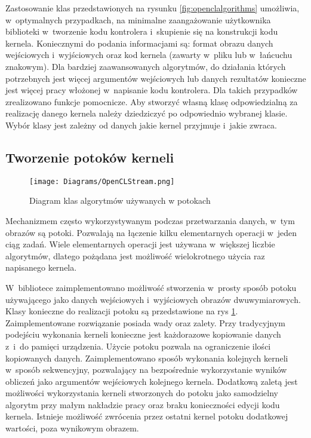 Zastosowanie klas przedstawionych na rysunku \ref{fig:openclalgorithms} umożliwia, w~optymalnych przypadkach, na minimalne zaangażowanie użytkownika biblioteki w~tworzenie kodu kontrolera i~skupienie się na konstrukcji kodu kernela. Koniecznymi do podania informacjami są: format obrazu danych wejściowych i~wyjściowych oraz kod kernela (zawarty w~pliku lub w~łańcuchu znakowym). Dla bardziej zaawansowanych algorytmów, do działania których potrzebnych jest więcej argumentów wejściowych lub danych rezultatów konieczne jest więcej pracy włożonej w~napisanie kodu kontrolera. Dla takich przypadków zrealizowano funkcje pomocnicze. Aby stworzyć własną klasę odpowiedzialną za realizację danego kernela należy dziedziczyć po odpowiednio wybranej klasie. Wybór klasy jest zależny od danych jakie kernel przyjmuje i~jakie zwraca.

\subsection{Tworzenie potoków kerneli}
\label{subsec:potokikerneli}

\begin{figure}
\begin{center}
\texttt{[image: Diagrams/OpenCLStream.png]}
\end{center}
\caption{Diagram klas algorytmów używanych w potokach}
\label{fig:diagrampotok}
\end{figure}

Mechanizmem często wykorzystywanym podczas przetwarzania danych, w~tym obrazów są potoki. Pozwalają na łączenie kilku elementarnych operacji w~jeden ciąg zadań. Wiele elementarnych operacji jest używana w~większej liczbie algorytmów, dlatego pożądana jest możliwość wielokrotnego użycia raz napisanego kernela.

W~bibliotece zaimplementowano możliwość stworzenia w~prosty sposób potoku używającego jako danych wejściowych i~wyjściowych obrazów dwuwymiarowych. Klasy konieczne do realizacji potoku są przedstawione na rys \ref{fig:diagrampotok}. Zaimplementowane rozwiązanie posiada wady oraz zalety. Przy tradycyjnym podejściu wykonania kerneli konieczne jest każdorazowe kopiowanie danych z~i~do pamięci urządzenia. Użycie potoku pozwala na ograniczenie ilości kopiowanych danych. Zaimplementowano sposób wykonania kolejnych kerneli w~sposób sekwencyjny, pozwalający na bezpośrednie wykorzystanie wyników obliczeń jako argumentów wejściowych kolejnego kernela. Dodatkową zaletą jest możliwości wykorzystania kerneli stworzonych do potoku jako samodzielny algorytm przy małym nakładzie pracy oraz braku konieczności edycji kodu kernela. Istnieje możliwość zwrócenia przez ostatni kernel potoku dodatkowej wartości, poza wynikowym obrazem.

